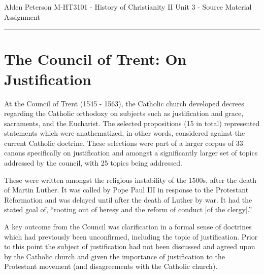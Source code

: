 \documentclass[12pt]{turabian-researchpaper}
\begin{document}
\begin{singlespace}
\noindent Alden Peterson \newline
\noindent M-HT3101 - History of Christianity II\newline
\noindent Unit 3 - Source Material Assignment
\newline\noindent\rule{4cm}{0.4pt}
\end{singlespace}





\section{The Council of Trent: On Justification}

At the Council of Trent (1545 - 1563), the Catholic church developed decrees regarding the Catholic orthodoxy on subjects such as justification and grace, sacraments, and the Eucharist.\autocite[pg.253]{woodbridge2013} The selected propositions (15 in total) represented statements which were anathematized\autocite[pg.266]{bettenson2011documents}, in other words, considered against the current Catholic doctrine. These selections were part of a larger corpus of 33 canons specifically on justification and amongst a significantly larger set of topics addressed by the council, with 25 topics being addressed\autocite{trent11}.

These were written amongst the religious instability of the 1500s, after the death of Martin Luther. It was called by Pope Paul III in response to the Protestant Reformation and was delayed until after the death of Luther by war.\autocite[pg.209]{woodbridge2013} It had the stated goal of, ``rooting out of heresy and the reform of conduct [of the clergy].''\autocite[pg.210]{woodbridge2013} 

A key outcome from the Council was clarification in a formal sense of doctrines which had previously been unconfirmed, including the topic of justification.\autocite[pg.211]{woodbridge2013} Prior to this point the subject of justification had not been discussed and agreed upon by the Catholic church and given the importance of justification to the Protestant movement (and disagreements with the Catholic church). 
\end{document}
